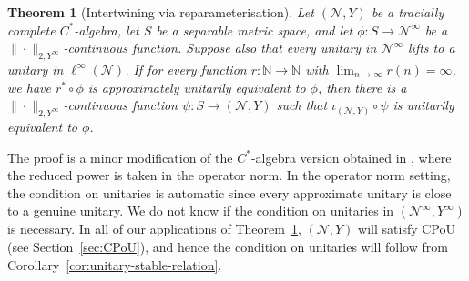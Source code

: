 \documentclass[a4paper,11pt]{amsart}
\newtheorem{theorem}{Theorem}
\theoremstyle{definition}
\numberwithin{equation}{section}
\numberwithin{theorem}{section}
\begin{document}
\begin{theorem}[Intertwining via reparameterisation]\label{thm:reparameterisation}
 Let $(\mathcal N, Y)$ be a tracially complete $C^*$-algebra, let $S$ be a separable metric space, and let $\phi \colon S \rightarrow \mathcal N^\infty$ be a $\|\cdot\|_{2, Y^\infty}$-continuous function. Suppose also that every unitary in $\mathcal N^\infty$ lifts to a unitary in $\ell^\infty(\mathcal N)$.  If for every function $r \colon \mathbb N \rightarrow \mathbb N$ with $\lim_{n \rightarrow \infty} r(n) = \infty$, we have $r^* \circ \phi$ is approximately unitarily equivalent to $\phi$, then there is a $\|\cdot\|_{2, Y^\infty}$-continuous function $\psi \colon S \rightarrow (\mathcal N, Y)$ such that $\iota_{(\mathcal{N}, Y)} \circ \psi$ is unitarily equivalent to $\phi$.
\end{theorem}

The proof is a minor modification of the $C^*$-algebra version obtained in \cite[Theorem~4.3]{Gabe18}, where the reduced power is taken in the operator norm.  In the operator norm setting, the condition on unitaries is automatic since every approximate unitary is close to a genuine unitary.  We do not know if the condition on unitaries in $(\mathcal N^\infty, Y^\infty)$ is necessary.  In all of our applications of Theorem~\ref{thm:reparameterisation}, $(\mathcal N, Y)$ will satisfy CPoU (see Section~\ref{sec:CPoU}), and hence the condition on unitaries will follow from Corollary~\ref{cor:unitary-stable-relation}.
\end{document}
